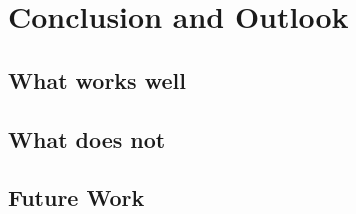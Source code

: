 \chapter{Conclusion and Outlook}

\label{ch:Conclusion}

\section{What works well}
\section{What does not}
\section{Future Work}
